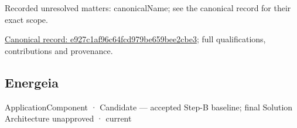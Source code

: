 {\small Recorded unresolved matters: canonicalName; see the canonical record for their exact scope.}\par
{\footnotesize \href{../../../../continuum/application/application-component/e927c1af96c64fcd979be659bee2cbe3.md}{Canonical record: e927c1af96c64fcd979be659bee2cbe3}; full qualifications, contributions and provenance.}\par
\subsection{Energeia}

\label{element:fb3f37a6ac614415ac486a6de9d35994}
{\small ApplicationComponent · Candidate — accepted Step-B baseline; final Solution Architecture unapproved · current}\par

